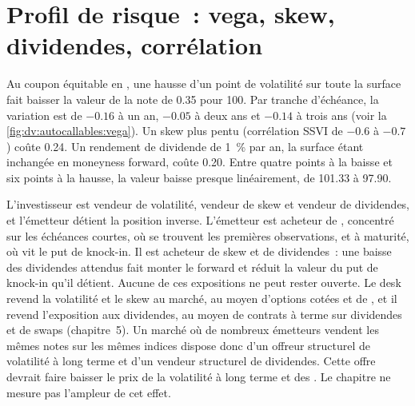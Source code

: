 \section{Profil de risque~: vega, skew, dividendes, corrélation}

\begin{example}\label{ex:dv:autocallables:greeks}
Au coupon équitable en , une hausse d'un point de volatilité sur toute la surface fait baisser la valeur de la note de 0.35 pour 100.
Par tranche d'échéance, la variation est de $-0.16$ à un an, $-0.05$ à deux ans et $-0.14$ à trois
ans (voir la \cref{fig:dv:autocallables:vega}). Un skew plus pentu (corrélation SSVI de $-0.6$ à $-0.7$) coûte 0.24. Un rendement de dividende de 1~\% par
an, la surface étant inchangée en moneyness forward, coûte 0.20. Entre quatre points à la baisse et six points à la hausse, la valeur
baisse presque linéairement, de 101.33 à 97.90.
\end{example}

L'investisseur est vendeur de volatilité, vendeur de skew et vendeur de dividendes, et l'émetteur détient la position inverse. L'émetteur est acheteur de ,
concentré sur les échéances courtes, où se trouvent les premières observations, et à maturité, où vit le put de knock-in. Il est acheteur de
skew et de dividendes~: une baisse des dividendes attendus fait monter le forward et réduit la valeur du put de knock-in qu'il détient. Aucune
de ces expositions ne peut rester ouverte. Le desk revend la volatilité et le skew au marché, au moyen d'options cotées et de , et il
revend l'exposition aux dividendes, au moyen de contrats à terme sur dividendes et de swaps (chapitre~5). Un marché où de nombreux émetteurs vendent les mêmes notes sur les
mêmes indices dispose donc d'un offreur structurel de volatilité à long terme et d'un vendeur structurel de dividendes. Cette offre devrait
faire baisser le prix de la volatilité à long terme et des . Le chapitre ne mesure pas l'ampleur de cet effet.

